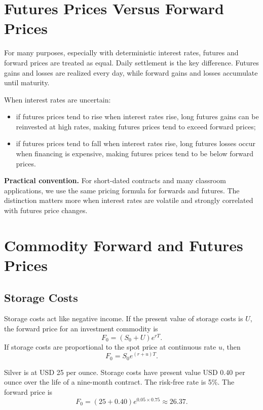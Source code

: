 \section{Futures Prices Versus Forward Prices}

For many purposes, especially with deterministic interest rates, futures and
forward prices are treated as equal. Daily settlement is the key difference.
Futures gains and losses are realized every day, while forward gains and losses
accumulate until maturity.

When interest rates are uncertain:
\begin{itemize}
    \item if futures prices tend to rise when interest rates rise, long futures
    gains can be reinvested at high rates, making futures prices tend to exceed
    forward prices;
    \item if futures prices tend to fall when interest rates rise, long futures
    losses occur when financing is expensive, making futures prices tend to be
    below forward prices.
\end{itemize}

\begin{boxD}
\textbf{Practical convention.} For short-dated contracts and many classroom
applications, we use the same pricing formula for forwards and futures. The
distinction matters more when interest rates are volatile and strongly
correlated with futures price changes.
\end{boxD}

\section{Commodity Forward and Futures Prices}

\subsection{Storage Costs}

Storage costs act like negative income. If the present value of storage costs is
$U$, the forward price for an investment commodity is
\[
    F_0=(S_0+U)e^{rT}.
\]
If storage costs are proportional to the spot price at continuous rate $u$, then
\[
    F_0=S_0e^{(r+u)T}.
\]

\begin{exmp}
Silver is at USD 25 per ounce. Storage costs have present value USD 0.40 per
ounce over the life of a nine-month contract. The risk-free rate is 5\%. The
forward price is
\[
    F_0=(25+0.40)e^{0.05\times 0.75}
    \approx 26.37.
\]
\end{exmp}

